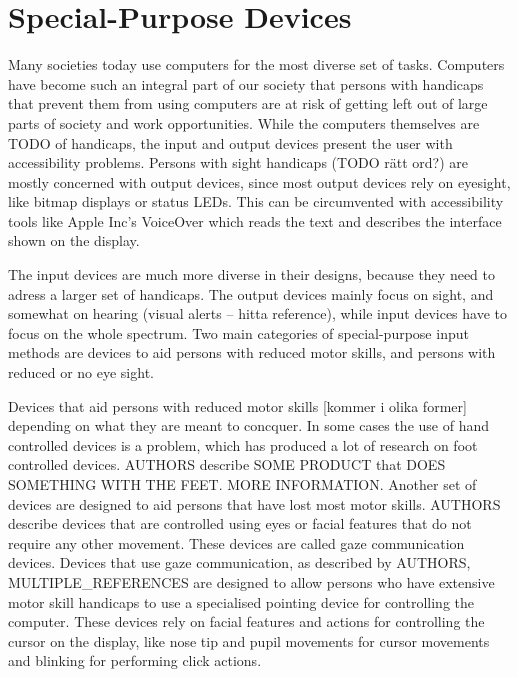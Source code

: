 \section{Special-Purpose Devices}

Many societies today use computers for the most diverse set of tasks. Computers have become such an integral part of our society that persons with handicaps that prevent them from using computers are at risk of getting left out of large parts of society and work opportunities. While the computers themselves are TODO of handicaps, the input and output devices present the user with accessibility problems. Persons with sight handicaps (TODO rätt ord?) are mostly concerned with output devices, since most output devices rely on eyesight, like bitmap displays or status LEDs. This can be circumvented with accessibility tools like Apple Inc's VoiceOver which reads the text and describes the interface shown on the display.

The input devices are much more diverse in their designs, because they need to adress a larger set of handicaps. The output devices mainly focus on sight, and somewhat on hearing (visual alerts -- hitta reference), while input devices have to focus on the whole spectrum. Two main categories of special-purpose input methods are devices to aid persons with reduced motor skills, and persons with reduced or no eye sight. 

Devices that aid persons with reduced motor skills [kommer i olika former] depending on what they are meant to concquer. In some cases the use of hand controlled devices is a problem, which has produced a lot of research on foot controlled devices. AUTHORS describe SOME PRODUCT that DOES SOMETHING WITH THE FEET. MORE INFORMATION. Another set of devices are designed to aid persons that have lost most motor skills. AUTHORS describe devices that are controlled using eyes or facial features that do not require any other movement. These devices are called gaze communication devices. Devices that use gaze communication, as described by AUTHORS, MULTIPLE\_REFERENCES are designed to allow persons who have extensive motor skill handicaps to use a specialised pointing device for controlling the computer. These devices rely on facial features and actions for controlling the cursor on the display, like nose tip and pupil movements for cursor movements and blinking for performing click actions.

